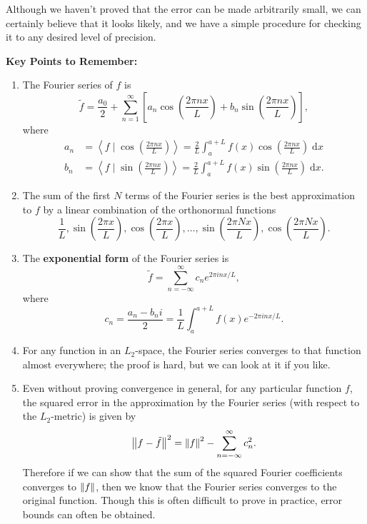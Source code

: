 \documentclass{article}
\newcommand{\diff}{\;\mathrm{d}}
\newcommand{\norm}[1]{\left|\kern-1pt\left|#1\right|\kern-1pt\right|}
\newcommand{\braket}[2]{\left\langle #1 \mid #2 \right\rangle}
\begin{document}
Although we haven't proved that the error can be made arbitrarily small, we can certainly believe that it looks likely, and we have a simple procedure for checking it to any desired level of precision.






\clearpage




{\bf Key Points to Remember:}

\vspace{5mm}

\begin{enumerate}
	\item The Fourier series of $f$ is
		\[\tilde{f}=\frac{a_0}{2}+\sum_{n=1}^\infty \left[a_n\cos\left(\frac{2\pi nx}{L}\right) + b_n\sin\left(\frac{2\pi nx}{L}\right)\right],\]
		where
		\begin{align*}
			a_n&=\braket{f}{\cos\left(\frac{2\pi nx}{L}\right)}=\frac{2}{L}\int_a^{a+L}\!\!\! f(x)\cos\left(\frac{2\pi nx}{L}\right)\diff x\\
			b_n &= \braket{f}{\sin\left(\frac{2\pi nx}{L}\right)}=\frac{2}{L}\int_a^{a+L}\!\!\! f(x)\sin\left(\frac{2\pi nx}{L}\right)\diff x.
		\end{align*}
	\item The sum of the first $N$ terms of the Fourier series is the best approximation to $f$ by a linear combination of the orthonormal functions
		\[\frac{1}{L},\sin\left(\frac{2\pi x}{L}\right),\cos\left(\frac{2\pi x}{L}\right),\hdots,\sin\left(\frac{2\pi Nx}{L}\right),\cos\left(\frac{2\pi Nx}{L}\right).\]
	\item The \textbf{exponential form} of the Fourier series is
		\[\tilde{f}=\sum_{n=-\infty}^\infty c_ne^{2\pi inx/L},\]
		where
		\[c_n=\frac{a_n-b_ni}{2}=\frac{1}{L}\int_a^{a+L}\!\!f(x)e^{-2\pi inx/L}.\]
	\item For any function in an $L_2$-space, the Fourier series converges to that function almost everywhere; the proof is hard, but we can look at it if you like.
	\item Even without proving convergence in general, for any particular function $f$, the squared error in the approximation by the Fourier series (with respect to the $L_2$-metric) is given by
		\[\norm{f-\tilde{f}}^2=\norm{f}^2-\sum_{n=-\infty}^\infty c_n^2.\]
		Therefore if we can show that the sum of the squared Fourier coefficients converges to $\norm{f}$, then we know that the Fourier series converges to the original function. Though this is often difficult to prove in practice, error bounds can often be obtained.
\end{enumerate}
\end{document}

